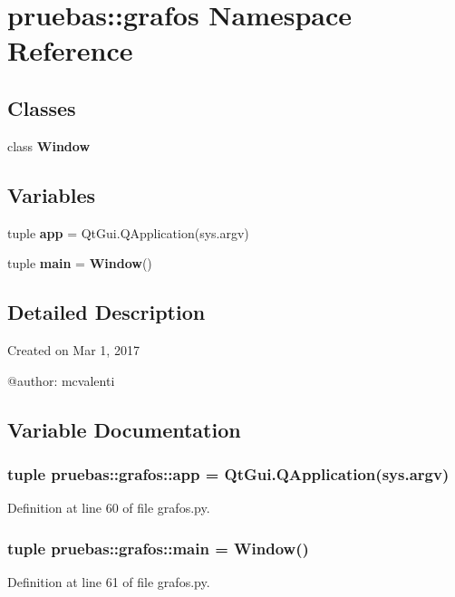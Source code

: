 \section{pruebas\-:\-:grafos \-Namespace \-Reference}
\label{namespacepruebas_1_1grafos}
\subsection*{\-Classes}
\begin{DoxyCompactItemize}
\item 
class {\bf \-Window}
\end{DoxyCompactItemize}
\subsection*{\-Variables}
\begin{DoxyCompactItemize}
\item 
tuple {\bf app} = \-Qt\-Gui.\-Q\-Application(sys.\-argv)
\item 
tuple {\bf main} = {\bf \-Window}()
\end{DoxyCompactItemize}


\subsection{\-Detailed \-Description}
\begin{DoxyVerb}
Created on Mar 1, 2017

@author: mcvalenti
\end{DoxyVerb}
 

\subsection{\-Variable \-Documentation}
\subsubsection[{app}]{\setlength{\rightskip}{0pt plus 5cm}tuple {\bf pruebas\-::grafos\-::app} = \-Qt\-Gui.\-Q\-Application(sys.\-argv)}\label{namespacepruebas_1_1grafos_ad5fe2e0b5e9c541c7da4637a85781aac}


\-Definition at line 60 of file grafos.\-py.

\subsubsection[{main}]{\setlength{\rightskip}{0pt plus 5cm}tuple {\bf pruebas\-::grafos\-::main} = {\bf \-Window}()}\label{namespacepruebas_1_1grafos_a15ccc54935321b970d5027d4f846c43e}


\-Definition at line 61 of file grafos.\-py.

